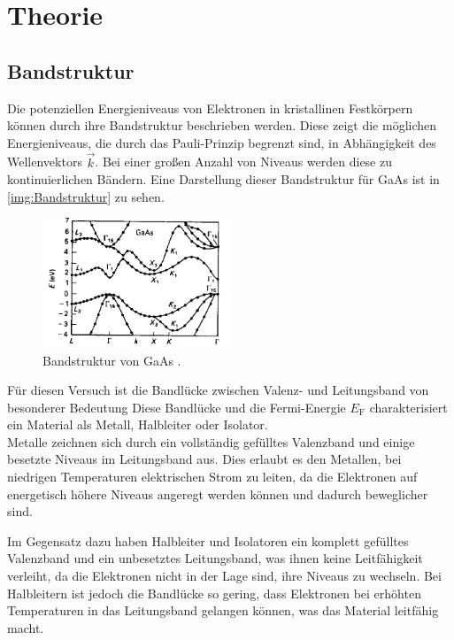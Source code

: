 \section{Theorie}
    \label{sec:Theorie}

    \subsection{Bandstruktur}

    Die potenziellen Energieniveaus von Elektronen in kristallinen Festkörpern können durch ihre Bandstruktur beschrieben werden.
    Diese zeigt die möglichen Energieniveaus, die durch das Pauli-Prinzip begrenzt sind, in Abhängigkeit des Wellenvektors $\vec{k}$.
    Bei einer großen Anzahl von Niveaus werden diese zu kontinuierlichen Bändern.
    Eine Darstellung dieser Bandstruktur für GaAs ist in \autoref{img:Bandstruktur} zu sehen.

    \begin{figure}[H]
        \centering
        \includegraphics[width=0.5\textwidth]{Bilder/GaAs.png}
        \caption{Bandstruktur von GaAs \cite{BandstructureGaAs}.}
        \label{img:Bandstruktur}
    \end{figure}

    Für diesen Versuch ist die Bandlücke zwischen Valenz- und Leitungsband von besonderer Bedeutung
    Diese Bandlücke und die Fermi-Energie $E_\text{F}$ charakterisiert ein Material als Metall, Halbleiter oder Isolator.\\

    Metalle zeichnen sich durch ein vollständig gefülltes Valenzband und einige besetzte Niveaus im Leitungsband aus. Dies erlaubt es den Metallen, bei niedrigen Temperaturen elektrischen Strom zu leiten, da die Elektronen auf energetisch höhere Niveaus angeregt werden können und dadurch beweglicher sind.

Im Gegensatz dazu haben Halbleiter und Isolatoren ein komplett gefülltes Valenzband und ein unbesetztes Leitungsband, was ihnen keine Leitfähigkeit verleiht, da die Elektronen nicht in der Lage sind, ihre Niveaus zu wechseln. Bei Halbleitern ist jedoch die Bandlücke so gering, dass Elektronen bei erhöhten Temperaturen in das Leitungsband gelangen können, was das Material leitfähig macht.

